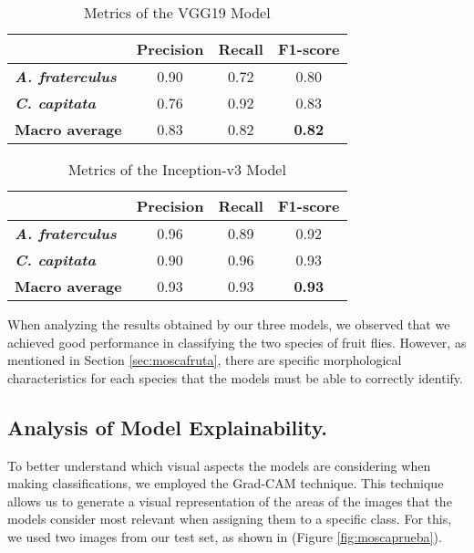 \begin{table}[htbp]
  \centering
  \caption{Metrics of the VGG19 Model}
  \label{tab:resultadosvgg19}
  \begin{tabular}{|l|c|c|c|}
  \hline
     & \textbf{Precision} & \textbf{Recall} & \textbf{F1-score} \\
    \hline
    \textbf{\textit{A. fraterculus}} & 0.90 & 0.72 & 0.80 \\
    \hline
    \textbf{\textit{C. capitata}} & 0.76 & 0.92 & 0.83 \\
    \hline
    \textbf{Macro average} & 0.83 & 0.82 & \textbf{0.82} \\
    \hline
  \end{tabular}
\end{table}

\begin{table}[htbp]
	\centering
	\caption{Metrics of the Inception-v3 Model}
	\label{tab:resultadosinception}
	\begin{tabular}{|l|c|c|c|}
		\hline
		& \textbf{Precision} & \textbf{Recall} & \textbf{F1-score} \\
		\hline
		\textbf{\textit{A. fraterculus}} & 0.96 & 0.89 & 0.92 \\
		\hline
		\textbf{\textit{C. capitata}} & 0.90 & 0.96 & 0.93 \\
		\hline
		\textbf{Macro average} & 0.93 & 0.93 & \textbf{0.93} \\
		\hline
	\end{tabular}
\end{table}

When analyzing the results obtained by our three models, we observed that we achieved good performance in classifying the two species of fruit flies. However, as mentioned in Section \ref{sec:moscafruta}, there are specific morphological characteristics for each species that the models must be able to correctly identify.

\subsection{Analysis of Model Explainability.}
\label{sec:cam}
To better understand which visual aspects the models are considering when making classifications, we employed the Grad-CAM technique. This technique allows us to generate a visual representation of the areas of the images that the models consider most relevant when assigning them to a specific class. For this, we used two images from our test set, as shown in (Figure \ref{fig:moscaprueba}).

